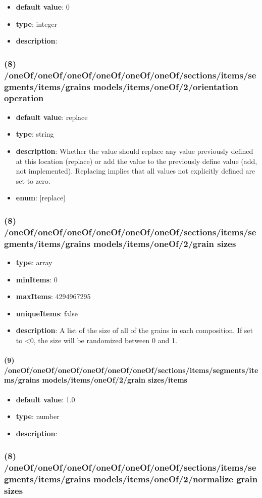 \begin{itemize}[leftmargin=9em]\item {\bf default value}: 0
\item {\bf type}: integer
\item {\bf description}: 
\end{itemize}\subsubsection{(8) /oneOf/oneOf/oneOf/oneOf/oneOf/oneOf/sections/items/segments/items/grains models/items/oneOf/2/orientation operation}
\begin{itemize}[leftmargin=8em]\item {\bf default value}: replace
\item {\bf type}: string
\item {\bf description}: Whether the value should replace any value previously defined at this location (replace) or add the value to the previously define value (add, not implemented). Replacing implies that all values not explicitly defined are set to zero.
\item {\bf enum}: [replace]\end{itemize}\subsubsection{(8) /oneOf/oneOf/oneOf/oneOf/oneOf/oneOf/sections/items/segments/items/grains models/items/oneOf/2/grain sizes}
\begin{itemize}[leftmargin=8em]\item {\bf type}: array
\item {\bf minItems}: 0
\item {\bf maxItems}: 4294967295
\item {\bf uniqueItems}: false
\item {\bf description}: A list of the size of all of the grains in each composition. If set to <0, the size will be randomized between 0 and 1.
\end{itemize}\paragraph{(9) /oneOf/oneOf/oneOf/oneOf/oneOf/oneOf/sections/items/segments/items/grains models/items/oneOf/2/grain sizes/items}
\begin{itemize}[leftmargin=9em]\item {\bf default value}: 1.0
\item {\bf type}: number
\item {\bf description}: 
\end{itemize}\subsubsection{(8) /oneOf/oneOf/oneOf/oneOf/oneOf/oneOf/sections/items/segments/items/grains models/items/oneOf/2/normalize grain sizes}
